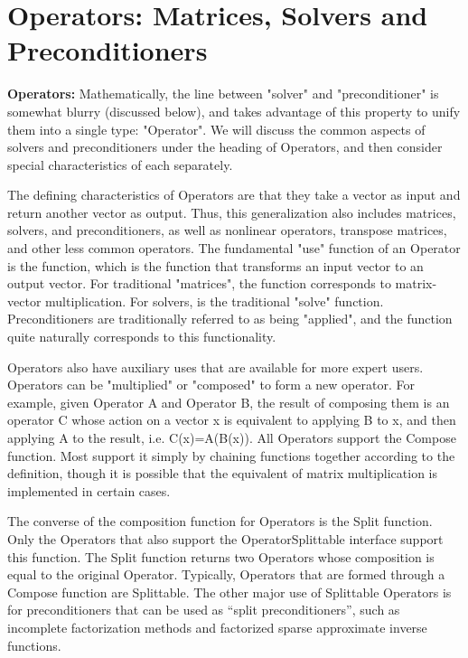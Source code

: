
\chapter{Operators: Matrices, Solvers and Preconditioners}

{\bf Operators:} Mathematically, the line between "solver" and "preconditioner" is
somewhat blurry (discussed 
below), and \hypre{} takes advantage of this property
to unify them into a single type: "Operator".
We will discuss the common aspects of
solvers and preconditioners under the heading of Operators,
and then consider special characteristics of each separately.

The defining characteristics of Operators are that they take a vector as input
and return another vector as 
output. Thus, this generalization also includes matrices, solvers, and preconditioners,
as well as nonlinear
operators, transpose matrices, 
and other less common operators. 
The fundamental "use" function of an Operator is the  function, which
is the function that transforms an input vector to an output vector. 
For traditional "matrices", the  function corresponds to
matrix-vector multiplication. For 
solvers,  is the traditional "solve" function. 
Preconditioners are traditionally
referred to as being "applied", 
and the  function quite naturally corresponds to this functionality. 

Operators also have auxiliary uses that are available for more
expert users.
Operators can be "multiplied" or "composed" to form a new operator.
For example, given Operator A and Operator B, the result of composing
them is an operator C whose action on a vector x is equivalent to
applying B to x, and then applying A to the result, i.e. C(x)=A(B(x)).
All Operators support the Compose function. 
Most support it simply by chaining  functions together according
to the definition, though it is possible that the equivalent of matrix 
multiplication is implemented in certain cases.

The converse of the composition function for Operators is the Split function.
Only the Operators that also support the OperatorSplittable interface support
this function.
The Split function returns two Operators whose composition is equal to 
the original Operator.
Typically, Operators that are formed through a Compose function are Splittable.
The other major use of Splittable Operators is for preconditioners that can be 
used as ``split preconditioners'', such as incomplete factorization methods and
factorized sparse approximate inverse functions.

